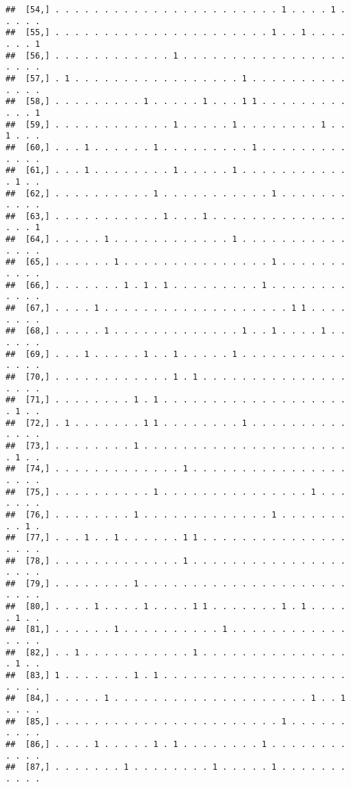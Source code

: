 \documentclass{article}\usepackage[]{graphicx}\usepackage[]{color}
\makeatletter
\newenvironment{kframe}{%
 \def\at@end@of@kframe{}%
 \ifinner\ifhmode%
  \def\at@end@of@kframe{\end{minipage}}%
  \begin{minipage}{\columnwidth}%
 \fi\fi%
 \def\FrameCommand##1{\hskip\@totalleftmargin \hskip-\fboxsep
 \colorbox{shadecolor}{##1}\hskip-\fboxsep
     \hskip-\linewidth \hskip-\@totalleftmargin \hskip\columnwidth}%
 \MakeFramed {\advance\hsize-\width
   \@totalleftmargin\z@ \linewidth\hsize
   \@setminipage}}%
 {\par\unskip\endMakeFramed%
 \at@end@of@kframe}
\newenvironment{knitrout}{}{} %
\makeatother
\begin{document}
\begin{knitrout}
\begin{kframe}
\begin{verbatim}
##  [54,] . . . . . . . . . . . . . . . . . . . . . . . 1 . . . . 1 . . . . .
##  [55,] . . . . . . . . . . . . . . . . . . . . . . 1 . . 1 . . . . . . . 1
##  [56,] . . . . . . . . . . . . 1 . . . . . . . . . . . . . . . . . . . . .
##  [57,] . 1 . . . . . . . . . . . . . . . . . 1 . . . . . . . . . . . . . .
##  [58,] . . . . . . . . . 1 . . . . . 1 . . . 1 1 . . . . . . . . . . . . 1
##  [59,] . . . . . . . . . . . . 1 . . . . . 1 . . . . . . . . 1 . . 1 . . .
##  [60,] . . . 1 . . . . . . 1 . . . . . . . . . 1 . . . . . . . . . . . . .
##  [61,] . . . 1 . . . . . . . . 1 . . . . . 1 . . . . . . . . . . . . 1 . .
##  [62,] . . . . . . . . . . 1 . . . . . . . . . . . 1 . . . . . . . . . . .
##  [63,] . . . . . . . . . . . 1 . . . 1 . . . . . . . . . . . . . . . . . 1
##  [64,] . . . . . 1 . . . . . . . . . . . . 1 . . . . . . . . . . . . . . .
##  [65,] . . . . . . 1 . . . . . . . . . . . . . . . 1 . . . . . . . . . . .
##  [66,] . . . . . . . 1 . 1 . 1 . . . . . . . . . 1 . . . . . . . . . . . .
##  [67,] . . . . 1 . . . . . . . . . . . . . . . . . . . 1 1 . . . . . . . .
##  [68,] . . . . . 1 . . . . . . . . . . . . . 1 . . 1 . . . . 1 . . . . . .
##  [69,] . . . 1 . . . . . 1 . . 1 . . . . . 1 . . . . . . . . . . . . . . .
##  [70,] . . . . . . . . . . . . 1 . 1 . . . . . . . . . . . . . . . . . . .
##  [71,] . . . . . . . . 1 . 1 . . . . . . . . . . . . . . . . . . . . 1 . .
##  [72,] . 1 . . . . . . . 1 1 . . . . . . . . 1 . . . . . . . . . . . . . .
##  [73,] . . . . . . . . 1 . . . . . . . . . . . . . . . . . . . . . . 1 . .
##  [74,] . . . . . . . . . . . . . 1 . . . . . . . . . . . . . . . . . . . .
##  [75,] . . . . . . . . . . 1 . . . . . . . . . . . . . . . 1 . . . . . . .
##  [76,] . . . . . . . . 1 . . . . . . . . . . . . . 1 . . . . . . . . . 1 .
##  [77,] . . . 1 . . 1 . . . . . . 1 1 . . . . . . . . . . . . . . . . . . .
##  [78,] . . . . . . . . . . . . . 1 . . . . . . . . . . . . . . . . . . . .
##  [79,] . . . . . . . . 1 . . . . . . . . . . . . . . . . . . . . . . . . .
##  [80,] . . . . 1 . . . . 1 . . . . 1 1 . . . . . . . 1 . 1 . . . . . 1 . .
##  [81,] . . . . . . 1 . . . . . . . . . . 1 . . . . . . . . . . . . . . . .
##  [82,] . . 1 . . . . . . . . . . . 1 . . . . . . . . . . . . . . . . 1 . .
##  [83,] 1 . . . . . . . 1 . 1 . . . . . . . . . . . . . . . . . . . . . . .
##  [84,] . . . . . 1 . . . . . . . . . . . . . . . . . . . . 1 . . 1 . . . .
##  [85,] . . . . . . . . . . . . . . . . . . . . . . . 1 . . . . . . . . . .
##  [86,] . . . . 1 . . . . . 1 . 1 . . . . . . . . 1 . . . . . . . . . . . .
##  [87,] . . . . . . . 1 . . . . . . . . 1 . . . . . 1 . . . . . . . . . . .

\end{verbatim}
\end{kframe}
\end{knitrout}
\end{document}
